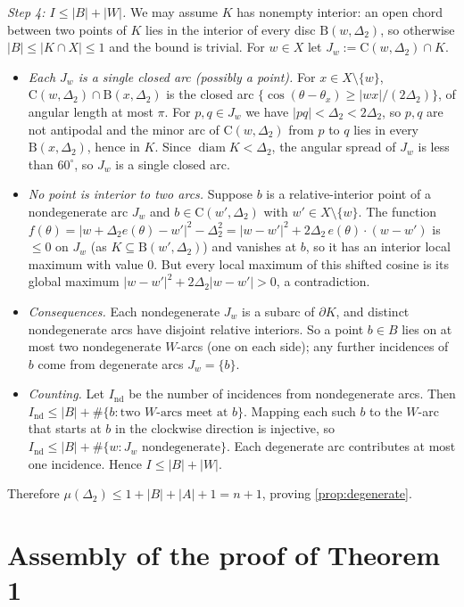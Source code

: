 \documentclass[11pt]{amsart}
\theoremstyle{definition}
\theoremstyle{remark}
\newcommand{\Dt}{\Delta_2}
\newcommand{\mult}{\mu}
\newcommand{\Cc}{\mathrm{C}}      %
\newcommand{\Dd}{\mathrm{B}}      %
\begin{document}
\emph{Step 4: $I\le|B|+|W|$.} We may assume $K$ has nonempty interior: an open chord between two points of $K$ lies in the interior of every disc $\Dd(w,\Dt)$, so otherwise $|B|\le|K\cap X|\le1$ and the bound is trivial. For $w\in X$ let $J_w:=\Cc(w,\Dt)\cap K$.
\begin{itemize}[leftmargin=2em]
\item \emph{Each $J_w$ is a single closed arc (possibly a point).} For $x\in X\setminus\{w\}$, $\Cc(w,\Dt)\cap\Dd(x,\Dt)$ is the closed arc $\{\cos(\theta-\theta_x)\ge|wx|/(2\Dt)\}$, of angular length at most $\pi$. For $p,q\in J_w$ we have $|pq|<\Dt<2\Dt$, so $p,q$ are not antipodal and the minor arc of $\Cc(w,\Dt)$ from $p$ to $q$ lies in every $\Dd(x,\Dt)$, hence in $K$. Since $\operatorname{diam}K<\Dt$, the angular spread of $J_w$ is less than $60^\circ$, so $J_w$ is a single closed arc.
\item \emph{No point is interior to two arcs.} Suppose $b$ is a relative-interior point of a nondegenerate arc $J_w$ and $b\in\Cc(w',\Dt)$ with $w'\in X\setminus\{w\}$. The function $f(\theta)=|w+\Dt e(\theta)-w'|^2-\Dt^2=|w-w'|^2+2\Dt\,e(\theta)\cdot(w-w')$ is $\le0$ on $J_w$ (as $K\subseteq\Dd(w',\Dt)$) and vanishes at $b$, so it has an interior local maximum with value $0$. But every local maximum of this shifted cosine is its global maximum $|w-w'|^2+2\Dt|w-w'|>0$, a contradiction.
\item \emph{Consequences.} Each nondegenerate $J_w$ is a subarc of $\partial K$, and distinct nondegenerate arcs have disjoint relative interiors. So a point $b\in B$ lies on at most two nondegenerate $W$-arcs (one on each side); any further incidences of $b$ come from degenerate arcs $J_w=\{b\}$.
\item \emph{Counting.} Let $I_{\mathrm{nd}}$ be the number of incidences from nondegenerate arcs. Then $I_{\mathrm{nd}}\le|B|+\#\{b:\text{two $W$-arcs meet at }b\}$. Mapping each such $b$ to the $W$-arc that starts at $b$ in the clockwise direction is injective, so $I_{\mathrm{nd}}\le|B|+\#\{w:J_w\text{ nondegenerate}\}$. Each degenerate arc contributes at most one incidence. Hence $I\le|B|+|W|$.
\end{itemize}
Therefore $\mult(\Dt)\le1+|B|+|A|+1=n+1$, proving \cref{prop:degenerate}.


\section{Assembly of the proof of Theorem 1}\label{sec:assembly}
\end{document}
